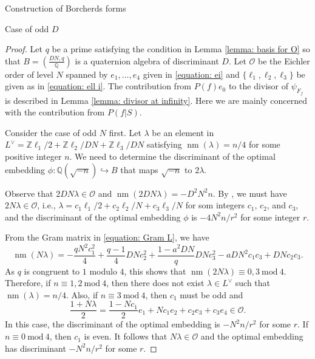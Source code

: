 \documentclass{amsart}
\newcounter{lemma}
\theoremstyle{definition}
\def\nm{\operatorname{nm}}
\def\O{\mathcal O}
\def\Q{\mathbb Q}
\def\Z{\mathbb Z}
\def\mod{\  \mathrm{mod}\ }
\def\JS#1#2{\left(\frac{#1}{#2}\right)}
\begin{document}
\begin{section}{Construction of Borcherds forms}
\begin{subsection}{Case of odd $D$}
\begin{proof} Let $q$ be a prime satisfying the condition in Lemma
  \ref{lemma: basis for O} so that $B=\JS{DN,q}\Q$ is a quaternion
  algebra of discriminant $D$. Let $\O$ be the Eichler order of level
  $N$ spanned by $e_1,\ldots,e_4$ given in \eqref{equation: ei} and
  $\{\ell_1,\ell_2,\ell_3\}$ be given as in \eqref{equation:
    ell i}. The contribution from $P(f)e_0$ to the divisor of
  $\psi_{F_f}$ is described in Lemma \ref{lemma: divisor at infinity}.
  Here we are mainly concerned
  with the contribution from $P(f|S)$.

  Consider the case of odd $N$ first. Let
  $\lambda$ be an element in
  $L^\vee=\Z\ell_1/2+\Z\ell_2/DN+\Z\ell_3/DN$ satisfying
  $\nm(\lambda)=n/4$ for some positive integer $n$. We need to
  determine the discriminant of the optimal embedding
  $\phi:\Q(\sqrt{-n})\hookrightarrow B$ that maps $\sqrt{-n}$ to
  $2\lambda$.

  Observe that $2DN\lambda\in\O$ and $\nm(2DN\lambda)=-D^2N^2n$.
  By {\cite[Proposition 1.53]{Bayer}}, we must have $2N\lambda\in\O$, i.e.,
  $\lambda=c_1\ell_1/2+c_2\ell_2/N+c_3\ell_3/N$ for som integers
  $c_1$, $c_2$, and $c_3$, and the discriminant of the optimal
  embedding $\phi$ is $-4N^2n/r^2$ for some integer $r$.

  From the Gram matrix in \eqref{equation: Gram L}, we have
  $$
    \nm(N\lambda)
  =-\frac{qN^2c_1^2}4+\frac{q-1}4DNc_2^2+\frac{1-a^2DN}qDNc_3^2
   -aDN^2c_1c_3+DNc_2c_3.
  $$
  As $q$ is congruent to $1$ modulo $4$, this shows that
  $\nm(2N\lambda)\equiv 0,3\mod 4$. Therefore, if $n\equiv 1,2\mod 4$,
  then there does not exist $\lambda\in L^\vee$ such that
  $\nm(\lambda)=n/4$. Also, if $n\equiv 3\mod 4$, then $c_1$ must be
  odd and
  $$
    \frac{1+N\lambda}2=\frac{1-Nc_1}2e_1+Nc_1e_2+c_2e_3+c_3e_4\in\O.
  $$
  In this case, the discriminant of the optimal embedding is
  $-N^2n/r^2$ for some $r$. If $n\equiv 0\mod 4$, then $c_1$
  is even. It follows that $N\lambda\in\O$ and the optimal embedding
  has discriminant $-N^2n/r^2$ for some $r$.


\end{proof}
\end{subsection}
\end{section}
\end{document}
